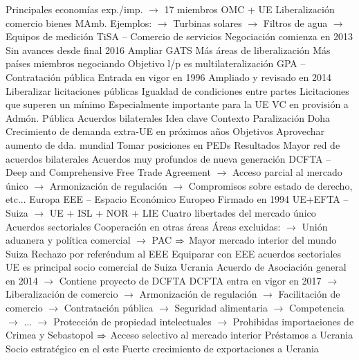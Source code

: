 \documentclass{nuevotema}
\begin{document}
\begin{esquemal}
				\4[] Principales economías exp./imp.
				\4[] $\to$ 17 miembros OMC + UE
				\4 Liberalización comercio bienes MAmb.
				\4[] Ejemplos:
				\4[] $\to$ Turbinas solares
				\4[] $\to$ Filtros de agua
				\4[] $\to$ Equipos de medición
			\3 TiSA -- Comercio de servicios
				\4 Negociación comienza en 2013
				\4[] Sin avances desde final 2016
				\4 Ampliar GATS
				\4[] Más áreas de liberalización
				\4[] Más países
				 miembros negociando
				\4 Objetivo l/p es multilateralización
			\3 GPA -- Contratación pública
				\4 Entrada en vigor en 1996
				\4[] Ampliado y revisado en 2014
				\4 Liberalizar licitaciones públicas
				\4[] Igualdad de condiciones entre partes
				\4[] Licitaciones que superen un mínimo
				\4 Especialmente importante para la UE
				\4[] VC en provisión a Admón. Pública
		\2 Acuerdos bilaterales
			\3 Idea clave
				\4 Contexto
				\4[] Paralización Doha
				\4[] Crecimiento de demanda extra-UE en próximos años
				\4 Objetivos
				\4[] Aprovechar aumento de dda. mundial
				\4[] Tomar posiciones en PEDs
				\4 Resultados
				\4[] Mayor red de acuerdos bilaterales
				\4[] Acuerdos muy profundos de nueva generación
				\4[] DCFTA -- Deep and Comprehensive Free Trade Agreement
				\4[] $\to$ Acceso parcial al mercado único
				\4[] $\to$ Armonización de regulación
				\4[] $\to$ Compromisos sobre estado de derecho, etc...
			\3 Europa
				\4 EEE -- Espacio Económico Europeo
				\4[] Firmado en 1994
				\4[] UE+EFTA -- Suiza
				\4[] $\to$ UE + ISL + NOR + LIE
				\4[] Cuatro libertades del mercado único
				\4[] Acuerdos sectoriales
				\4[] Cooperación en otras áreas
				\4[] Áreas excluidas:
				\4[] $\to$ Unión aduanera y política comercial
				\4[] $\to$ PAC
				\4[] $\Rightarrow$ Mayor mercado interior del mundo
				\4 Suiza
				\4[] Rechazo por referéndum al EEE
				\4[] Equiparar con EEE
				 acuerdos sectoriales
				\4[] UE es principal socio comercial de Suiza
				\4 Ucrania
				\4[] Acuerdo de Asociación general en 2014
				\4[] $\to$ Contiene proyecto de DCFTA
				\4[] DCFTA entra en vigor en 2017
				\4[] $\to$ Liberalización de comercio
				\4[] $\to$ Armonización de regulación
				\4[] $\to$ Facilitación de comercio
				\4[] $\to$ Contratación pública
				\4[] $\to$ Seguridad alimentaria
				\4[] $\to$ Competencia
				\4[] $\to$ ...
				\4[] $\to$ Protección de propiedad intelectuales
				\4[] $\to$ Prohibidas importaciones de Crimea y Sebastopol
				\4[] $\Rightarrow$ Acceso selectivo al mercado interior
				\4[] Préstamos a Ucrania
				\4[] Socio estratégico en el este
				\4[] Fuerte crecimiento de exportaciones a Ucrania

\end{esquemal}
\end{document}
